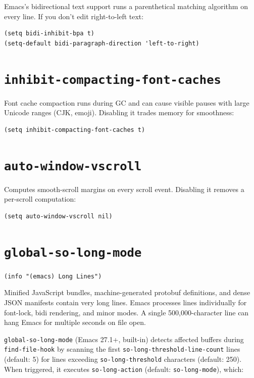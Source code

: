 Emacs's bidirectional text support runs a parenthetical matching algorithm on every line. If you don't edit right-to-left text:

\begin{verbatim}
(setq bidi-inhibit-bpa t)
(setq-default bidi-paragraph-direction 'left-to-right)
\end{verbatim}

\section{\texttt{inhibit-compacting-font-caches}}\label{inhibit-compacting-font-caches}

Font cache compaction runs during GC and can cause visible pauses with large Unicode ranges (CJK, emoji). Disabling it trades memory for smoothness:

\begin{verbatim}
(setq inhibit-compacting-font-caches t)
\end{verbatim}

\section{\texttt{auto-window-vscroll}}\label{auto-window-vscroll}

Computes smooth-scroll margins on every scroll event. Disabling it removes a per-scroll computation:

\begin{verbatim}
(setq auto-window-vscroll nil)
\end{verbatim}

\section{\texttt{global-so-long-mode}}\label{global-so-long-mode}

\texttt{(info "(emacs) Long Lines")}

Minified JavaScript bundles, machine-generated protobuf definitions, and dense JSON manifests contain very long lines. Emacs processes lines individually for font-lock, bidi rendering, and minor modes. A single 500,000-character line can hang Emacs for multiple seconds on file open.

\texttt{global-so-long-mode} (Emacs 27.1+, built-in) detects affected buffers during \texttt{find-file-hook} by scanning the first \texttt{so-long-threshold-line-count} lines (default: 5) for lines exceeding \texttt{so-long-threshold} characters (default: 250). When triggered, it executes \texttt{so-long-action} (default: \texttt{so-long-mode}), which:

